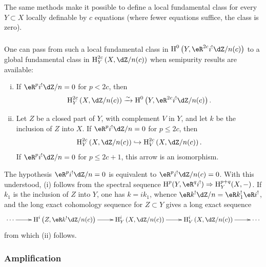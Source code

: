 The same methods make it possible to define a local fundamental class for
every $Y\subset X$ locally definable by $c$ equations (where fewer equations
suffice, the class is zero).






\subsubsection{}\label{IV:2-2-5}

One can pass from such a local fundamental class in
$\h^0\left(Y,\eR^{2 c} i^!\dZ/n(c)\right)$ to a global fundamental class in
$\h_Y^{2 c}\left(X,\dZ/n(c)\right)$ when semipurity results are available:






\begin{proposition}\label{IV:2-2-6}
\begin{enumerate}[(i)]
  \item If $\eR^p i^!\dZ/n=0$ for $p<2 c$, then
    \[
      \h_Y^{2 c}\left(X,\dZ/n(c)\right) \iso \h^0\left(Y,\eR^{2 c} i^! \dZ/n(c)\right) \text{.}
    \]
  \item Let $Z$ be a closed part of $Y$, with complement $V$ in $Y$, and let
    $k$ be the inclusion of $Z$ into $X$. If $\eR^p i^! \dZ/n = 0$ for
    $p\leqslant 2 c$, then
    \[
      \h_Y^{2 c}\left(X,\dZ/n(c)\right) \hookrightarrow \h_V^{2 c}\left(X,\dZ/n(c)\right) \text{.}
    \]
    If $\eR^p i^!\dZ/n=0$ for $p\leqslant 2 c+1$, this arrow is an
    isomorphism.
\end{enumerate}
\end{proposition}

The hypothesis $\eR^p i^!\dZ/n=0$ is equivalent to
$\eR^p i^!\dZ/n(c)=0$. With this understood, (i) follows from the spectral
sequence $\h^p(Y,\eR^q i^!)\Rightarrow \h_Y^{p+q}(X,-)$. If $k_1$ is the
inclusion of $Z$ into $Y$, one has $k=i k_1$, whence
$\eR k^! \dZ/n=\eR k_1^! \eR i^!$, and the long exact cohomology sequence for
$Z\subset Y$ gives a long exact sequence
\[\xymatrix{
  \cdots \ar[r]
    & \h^i\left(Z,\eR k^! \dZ/n(c)\right) \ar[r]
    & \h_Y^i\left(X,\dZ/n(c)\right) \ar[r]
    & \h_V^i\left(X,\dZ/n(c)\right) \ar[r]
    & \cdots
}\]
from which (ii) follows.






\subsubsection{Amplification}\label{IV:2-2-7}

